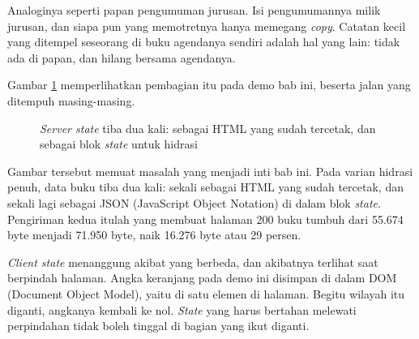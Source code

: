 Analoginya seperti papan pengumuman jurusan. Isi pengumumannya milik jurusan,
dan siapa pun yang memotretnya hanya memegang \textit{copy}. Catatan kecil yang
ditempel seseorang di buku agendanya sendiri adalah hal yang lain: tidak ada
di papan, dan hilang bersama agendanya.

Gambar \ref{fig:state} memperlihatkan pembagian itu pada demo bab ini,
beserta jalan yang ditempuh masing-masing.

\begin{figure}[!htb]
  \centering
  \caption{\textit{Server state} tiba dua kali: sebagai HTML yang sudah
           tercetak, dan sebagai blok \textit{state} untuk hidrasi}
  \label{fig:state}
\end{figure}

Gambar tersebut memuat masalah yang menjadi inti bab ini. Pada varian hidrasi
penuh, data buku tiba dua kali: sekali sebagai HTML yang sudah tercetak, dan
sekali lagi sebagai JSON (JavaScript Object Notation) di dalam blok
\textit{state}. Pengiriman kedua itulah yang membuat halaman 200 buku tumbuh
dari 55.674 byte menjadi 71.950 byte, naik 16.276 byte atau 29 persen.

\textit{Client state} menanggung akibat yang berbeda, dan akibatnya terlihat
saat berpindah halaman. Angka keranjang pada demo ini disimpan di dalam DOM
(Document Object Model), yaitu di satu elemen di halaman. Begitu wilayah itu
diganti, angkanya kembali ke nol. \textit{State} yang harus bertahan melewati
perpindahan tidak boleh tinggal di bagian yang ikut diganti.

